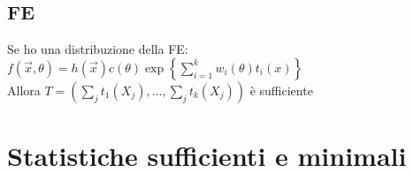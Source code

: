 \documentclass[a4paper,notitlepage]{report}%
\begin{document}
\begin{multicols*}{2}
    \subsection*{FE}
    Se ho una distribuzione della FE:\\
    $f(\vec{x},\theta) = h(\vec{x}) c(\theta) \exp\left\{ \sum_{i=1}^k w_i(\theta) t_i(x) \right\}$ \\
    Allora $T=(\sum_j t_1(X_j), \dots, \sum_j t_k(X_j) )$ è sufficiente


\section*{Statistiche sufficienti e minimali}







\end{multicols*}
\end{document}
